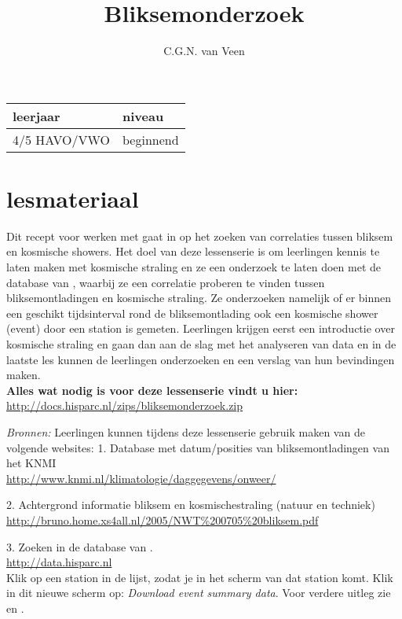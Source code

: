 
\usepackage{xfrac}
\usepackage{array}

\title{Bliksemonderzoek}
\author{C.G.N. van Veen}



\maketitle

\begin{tabular}{|>{\raggedright}p{3cm}|>{\raggedright}p{12cm}|}
\hline
leerjaar & niveau \tabularnewline
\hline
4/5 HAVO/VWO  & beginnend \tabularnewline
\hline
\end{tabular}

\section{lesmateriaal}

Dit recept voor werken met \hisparc gaat in op het zoeken van correlaties tussen
bliksem en kosmische showers. Het doel van deze lessenserie is om leerlingen
kennis te laten maken met kosmische straling en ze een onderzoek te laten doen
met de database van \hisparc, waarbij ze een correlatie proberen te vinden tussen
bliksemontladingen en kosmische straling. Ze onderzoeken namelijk of er binnen een geschikt
tijdsinterval rond de bliksemontlading ook een kosmische shower (event) door
een \hisparc station is gemeten.
Leerlingen krijgen eerst een introductie over kosmische straling en gaan
dan aan de slag met het analyseren van \hisparc data en in de laatste les kunnen
de leerlingen onderzoeken en een verslag van hun bevindingen maken.
\\

\textbf{Alles wat nodig is voor deze lessenserie vindt u hier:}\\
\url{http://docs.hisparc.nl/zips/bliksemonderzoek.zip}


\textit{Bronnen:} Leerlingen kunnen tijdens deze lessenserie gebruik maken van de
volgende websites:
1. Database met datum/posities van bliksemontladingen van het KNMI\\
\url{ http://www.knmi.nl/klimatologie/daggegevens/onweer/}

2. Achtergrond informatie bliksem en kosmischestraling (natuur en techniek)\\
\url{ http://bruno.home.xs4all.nl/2005/NWT%200705%20bliksem.pdf}

3. Zoeken in de database van \hisparc.\\
\url{http://data.hisparc.nl}\\
Klik op een station in de lijst, zodat je in het scherm van dat station komt.
Klik in dit nieuwe scherm op: \textit{Download event summary data}.
Voor verdere uitleg zie  en .

